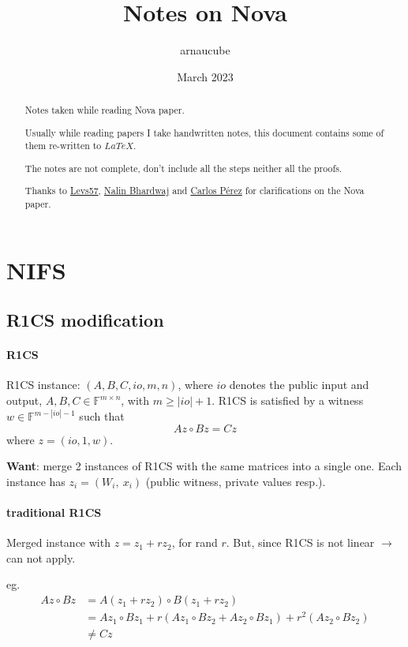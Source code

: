 \documentclass{article}
\title{Notes on Nova}
\author{arnaucube}
\date{March 2023}
\theoremstyle{definition}
\begin{document}
\maketitle

\begin{abstract}
	Notes taken while reading Nova \cite{cryptoeprint:2021/370} paper.

	Usually while reading papers I take handwritten notes, this document contains some of them re-written to $LaTeX$.

	The notes are not complete, don't include all the steps neither all the proofs.
	
	Thanks to \href{https://twitter.com/levs57}{Levs57}, \href{https://twitter.com/nibnalin}{Nalin Bhardwaj} and \href{https://twitter.com/cperezz19}{Carlos Pérez} for clarifications on the Nova paper.
\end{abstract}

\tableofcontents

\section{NIFS}

\subsection{R1CS modification}

\paragraph{R1CS}
R1CS instance: $(A, B, C, io, m, n)$, where $io$ denotes the public input and output, $A, B, C \in \mathbb{F}^{m \times n}$, with $m \geq |io|+1$.
R1CS is satisfied by a witness $w \in \mathbb{F}^{m-|io|-1}$ such that
$$Az \circ Bz = Cz$$
where $z=(io, 1, w)$.

\vspace{0.5cm}

\textbf{Want}: merge 2 instances of R1CS with the same matrices into a single one. Each instance has $z_i = (W_i,~ x_i)$ (public witness, private values resp.).

\paragraph{traditional R1CS}
Merged instance with $z=z_1 + r z_2$, for rand $r$. But, since R1CS is not linear $\longrightarrow$ can not apply.

eg.
\begin{align*}
	Az \circ Bz &= A(z_1 + r z_2) \circ B (z_1 + r z_2)\\
	&= A z_1 \circ B z_1 + r(A z_1 \circ B z_2 + A z_2 \circ B z_1) + r^2 (A z_2 \circ B z_2)\\
	&\neq Cz
\end{align*}
\end{document}
